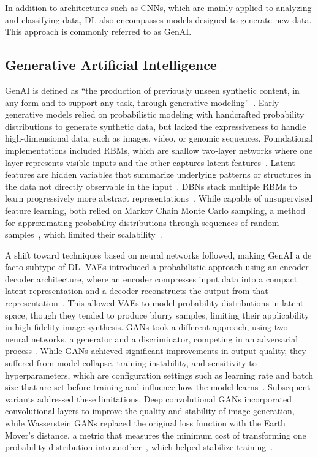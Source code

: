 \documentclass[
english,                 %
bibtex,                  %
]{kththesis}
\numberwithin{listing}{chapter}
\begin{document}
In addition to architectures such as \glspl{CNN}, which are mainly applied to analyzing and classifying data, \gls{DL} also encompasses models designed to generate new data. This approach is commonly referred to as \gls{GenAI}.

\subsection{Generative Artificial Intelligence}
\glsresetall
\label{sec:bg_genai}

\Gls{GenAI} is defined as “the production of previously unseen synthetic content, in any form and to support any task, through generative modeling”~\cite{garcia_penalvo_what_2023}. Early generative models relied on probabilistic modeling with handcrafted probability distributions to generate synthetic data, but lacked the expressiveness to handle high-dimensional data, such as images, video, or genomic sequences. Foundational implementations included \glspl{RBM}, which are shallow two-layer networks where one layer represents visible inputs and the other captures latent features~\cite{smolensky_information_1986}. Latent features are hidden variables that summarize underlying patterns or structures in the data not directly observable in the input~\cite{goodfellow_deep_2016}. \Glspl{DBN} stack multiple \glspl{RBM} to learn progressively more abstract representations~\cite{schmidhuber_deep_2015}. While capable of unsupervised feature learning, both relied on Markov Chain Monte Carlo sampling, a method for approximating probability distributions through sequences of random samples~\cite{metropolis_equation_1953}, which limited their scalability~\cite{trigka_evolution_2025}.

A shift toward techniques based on neural networks followed, making \gls{GenAI} a de facto subtype of \gls{DL}. \Glspl{VAE} introduced a probabilistic approach using an encoder-decoder architecture, where an encoder compresses input data into a compact latent representation and a decoder reconstructs the output from that representation~\cite{kingma_auto-encoding_2013}. This allowed \glspl{VAE} to model probability distributions in latent space, though they tended to produce blurry samples, limiting their applicability in high-fidelity image synthesis. \Glspl{GAN} took a different approach, using two neural networks, a generator and a discriminator, competing in an adversarial process \cite{goodfellow_generative_2014}. While \glspl{GAN} achieved significant improvements in output quality, they suffered from model collapse, training instability, and sensitivity to hyperparameters, which are configuration settings such as learning rate and batch size that are set before training and influence how the model learns~\cite{bergstra_random_2012}. Subsequent variants addressed these limitations. Deep convolutional \glspl{GAN} incorporated convolutional layers to improve the quality and stability of image generation, while Wasserstein \glspl{GAN} replaced the original loss function with the Earth Mover's distance, a metric that measures the minimum cost of transforming one probability distribution into another~\cite{rubner_earth_2000}, which helped stabilize training~\cite{trigka_evolution_2025}.
\end{document}
